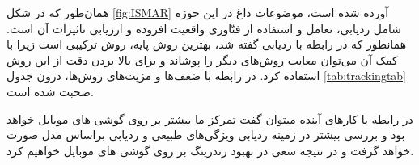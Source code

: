 همان‌طور که در شکل \ref{fig:ISMAR} آورده شده است، موضوعات داغ در این حوزه شامل ردیابی، تعامل و استفاده از فنّاوری واقعیت افزوده و ارزیابی تاثیرات آن است. همانطور که در رابطه با ردیابی گفته شد، بهترین روش‌ پایه، روش ترکیبی است زیرا با کمک آن می‌توان معایب روش‌های دیگر را پوشاند و برای بالا بردن دقت از این روش استفاده کرد. در رابطه با ضعف‌ها و مزیت‌های روش‌ها، درون جدول \ref{tab:trackingtab} صحبت شده است.

در رابطه با کارهای آینده میتوان گفت تمرکز ما بیشتر بر روی گوشی های موبایل خواهد بود و بررسی بیشتر در زمینه ردیابی ویژگی‌های طبیعی و ردیابی براساس مدل صورت خواهد گرفت و در نتیجه سعی در بهبود رندرینگ بر روی گوشی های موبایل خواهیم کرد.
